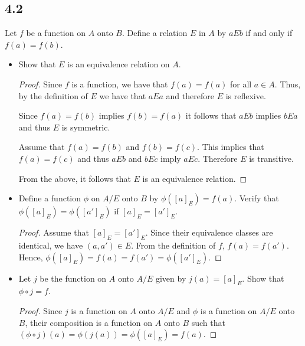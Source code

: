\subsection*{4.2} Let $f$ be a function on $A$ onto $B$. Define a relation $E$ in $A$  by $aEb$ if and only if $f(a) = f(b)$.

\begin{itemize}
    \item Show that $E$ is an equivalence relation on $A$.
    
    \begin{proof}
        Since $f$ is a function, we have that $f(a) = f(a)$ for all $a \in A$. Thus, by the definition of $E$ we have that $aEa$ and therefore $E$ is reflexive.
        
        Since $f(a) = f(b)$ implies $f(b) = f(a)$ it follows that $aEb$ implies $bEa$ and thus $E$ is symmetric.
        
        Assume that $f(a) = f(b)$ and $f(b) = f(c)$. This implies that $f(a) = f(c)$ and thus $aEb$ and $bEc$ imply $aEc$. Therefore $E$ is transitive.
        
        From the above, it follows that $E$ is an equivalence relation.
    \end{proof}
    
    \item Define a function $\phi$ on $A/E$ onto $B$ by $\phi([a]_E) = f(a)$. Verify that $\phi([a]_E) = \phi([a']_E)$ if $[a]_E = [a']_E$.
    
    \begin{proof}
        Assume that $[a]_E = [a']_E$. Since their equivalence classes are identical, we have $(a, a') \in E$. From the definition of $f$, $f(a) = f(a')$. Hence, $\phi([a]_E) = f(a) = f(a') = \phi([a']_E)$.
    \end{proof}
    
    \item Let $j$ be the function on $A$ onto $A/E$ given by $j(a) = [a]_E$. Show that $\phi \circ j = f$.
    
    \begin{proof}
        Since $j$ is a function on $A$ onto $A/E$ and $\phi$ is a function on $A/E$ onto $B$, their composition is a function on $A$ onto $B$ such that $(\phi \circ j)(a) = \phi(j(a)) = \phi([a]_E) = f(a)$.
    \end{proof}
\end{itemize}

\newpage

